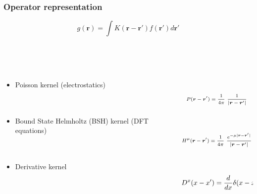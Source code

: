 \documentclass[mathserif]{beamer}
\begin{document}
\begin{frame}
    \frametitle{Operator representation}
    \begin{equation}
	\nonumber
	g(\boldsymbol{r}) = \int K(\boldsymbol{r} - \boldsymbol{r'}) 
	    f(\boldsymbol{r'}) d\boldsymbol{r'}
    \end{equation}
    \ \\
    \ \\
    \ \\
    \begin{columns}
    \begin{column}{.48\textwidth}
    \begin{itemize}
	\item Poisson kernel (electrostatics)
	    \ \\
	    \ \\
	    \ \\
	\item Bound State Helmholtz (BSH) kernel (DFT equations)
	    \ \\
	    \ \\
	    \ \\
	\item Derivative kernel
    \end{itemize}
    \end{column}
    \begin{column}{.48\textwidth}
    \ \\
    \begin{equation}
	\nonumber
	\scriptsize
	P(\boldsymbol{r}-\boldsymbol{r}') = 
	    \frac{1}{4\pi}\ \frac{1}{|\boldsymbol{r}-\boldsymbol{r}'|}
    \end{equation}
    \ \\
    \ \\
    \begin{equation}
	\nonumber
	\scriptsize
	H^{\mu}(\boldsymbol{r}-\boldsymbol{r}') = \frac{1}{4\pi}\ 
	    \frac{e^{-\mu |\boldsymbol{r}-\boldsymbol{r}'|}}{|\boldsymbol{r}-\boldsymbol{r}'|}
    \end{equation}
    \ \\
    \ \\
    \begin{equation}
	\nonumber
	\scriptsize
	D^x(x-x') = \frac{d}{dx} \delta(x - x')
    \end{equation}
    \end{column}
    \end{columns}    
\end{frame}
\end{document}
